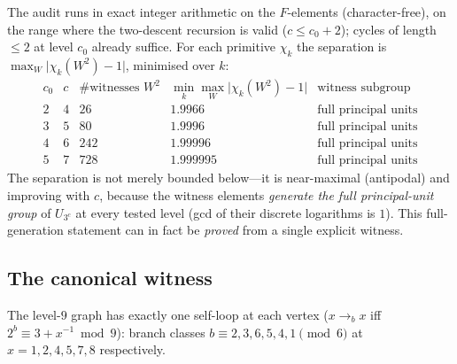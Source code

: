 \documentclass[11pt]{article}
\theoremstyle{plain}
\theoremstyle{definition}
\theoremstyle{remark}
\begin{document}
The audit runs in exact integer arithmetic on the $F$-elements
(character-free), on the range where the two-descent recursion is valid
($c\le c_0+2$); cycles of length $\le2$ at level $c_0$ already suffice. For each
primitive $\chi_k$ the separation is
$\max_W\lvert\chi_k(W^2)-1\rvert$, minimised over $k$:
\[
\begin{array}{cc|ccc}
c_0 & c & \#\text{witnesses }W^2 & \min_k\max_W\lvert\chi_k(W^2)-1\rvert & \text{witness subgroup}\\\hline
2 & 4 & 26 & 1.9966 & \text{full principal units}\\
3 & 5 & 80 & 1.9996 & \text{full principal units}\\
4 & 6 & 242 & 1.99996 & \text{full principal units}\\
5 & 7 & 728 & 1.999995 & \text{full principal units}
\end{array}
\]
The separation is not merely bounded below---it is near-maximal (antipodal) and
improving with $c$, because the witness elements \emph{generate the full
principal-unit group} of $U_{3^c}$ at every tested level (gcd of their discrete
logarithms is $1$). This full-generation statement can in fact be \emph{proved}
from a single explicit witness.

\subsection*{The canonical witness}

The level-$9$ graph has exactly one self-loop at each vertex
($x\to_bx$ iff $2^b\equiv3+x^{-1}\bmod9$): branch classes
$b\equiv2,3,6,5,4,1\pmod6$ at $x=1,2,4,5,7,8$ respectively.
\end{document}
